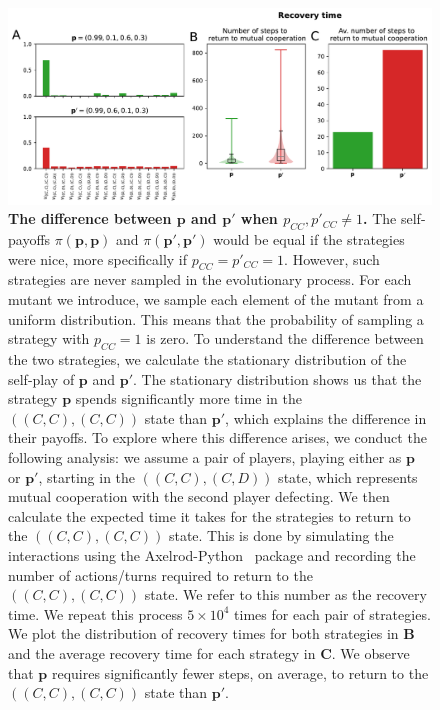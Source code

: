 \documentclass[11pt]{article}
\theoremstyle{plainCl1}
\theoremstyle{plainCl2}
\begin{document}
\begin{figure}
  \centering
  \includegraphics[width=\textwidth]{../../figures/siFigReactiveTwoPayoffs.pdf}
  \caption{\textbf{The difference between \(\mathbf{p}\) and \(\mathbf{p'}\) when
  \(p_{CC}, p'_{CC} \neq 1\).}
  The self-payoffs \(\pi(\mathbf{p}, \mathbf{p})\) and \(\pi(\mathbf{p'},
  \mathbf{p'})\) would be equal if the strategies were nice, more specifically if
  \(p_{CC} = p'_{CC} = 1\). However, such strategies are never
  sampled in the evolutionary process. For each mutant we introduce, we sample
  each element of the mutant from a uniform distribution. This means that the
  probability of sampling a strategy with \(p_{CC} = 1\) is zero.
  To understand the difference between the two strategies, we
  calculate the stationary distribution of the self-play of \(\mathbf{p}\) and \(\mathbf{p'}\). The
  stationary distribution shows us that the strategy \(\mathbf{p}\) spends significantly
  more time in the \(((C, C), (C, C))\) state than \(\mathbf{p'}\), which explains the
  difference in their payoffs.
  To explore where this difference arises, we conduct the following analysis: we
  assume a pair of players, playing either as \(\mathbf{p}\) or
  \(\mathbf{p'}\), starting in the \(((C, C), (C, D))\) state, which represents
  mutual cooperation with the second player defecting. We then calculate the
  expected time it takes for the strategies to return to the \(((C, C), (C, C))\)
  state. This is done by simulating the interactions using the Axelrod-Python~\cite{AxelrodPython}
  package and recording the number of actions/turns required to return to the
  \(((C, C), (C, C))\) state. We refer to this number as the recovery time. We repeat
  this process \(5 \times 10^4\) times for each pair of strategies. We plot the
  distribution of recovery times for both strategies in {\bf B} and the average
  recovery time for each strategy in {\bf C}. We observe that \(\mathbf{p}\)
  requires significantly fewer steps, on average, to return to the \(((C, C), (C, C))\) state
  than \(\mathbf{p'}\).}\label{fig:ReactiveTwoPayoffs}
\end{figure}
\end{document}
